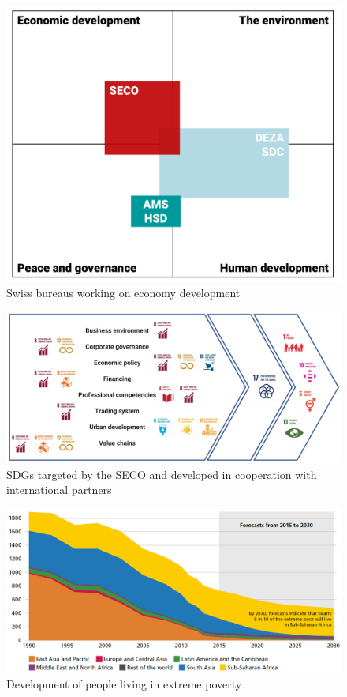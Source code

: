 \documentclass[11pt]{article}
\theoremstyle{definition}
\begin{document}
\begin{figure}[H]
	\centering
	\includegraphics[width=0.6\linewidth]{img/swiss_development_coalition}
	\caption{Swiss bureaus working on economy development}
	\label{fig:swissdevelopmentcoalition}
\end{figure}

\begin{figure}[H]
	\centering
	\includegraphics[width=0.8\linewidth]{img/SDG_targets_SECO.png}
	\caption{SDGs targeted by the SECO and developed in cooperation with international partners}
	\label{fig:secosdgtargets}
\end{figure}

\begin{figure}[H]
	\centering
	\includegraphics[width=0.8\linewidth]{img/people_living_extreme_poverty}
	\caption{Development of people living in extreme poverty}
	\label{fig:peoplelivingextremepoverty}
\end{figure}
\end{document}
